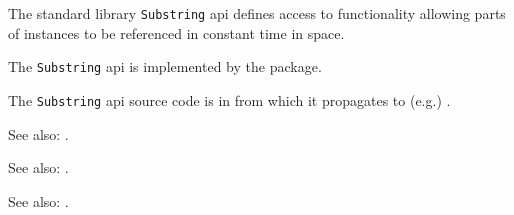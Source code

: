 
The standard library {\tt Substring} api defines access to functionality allowing 
parts of  instances to be referenced in 
constant time in space.

The {\tt Substring} api is implemented by the  package.

The {\tt Substring} api source code is in  
from which it propagates to (e.g.) .

See also:  .

See also:  .

See also:  .


